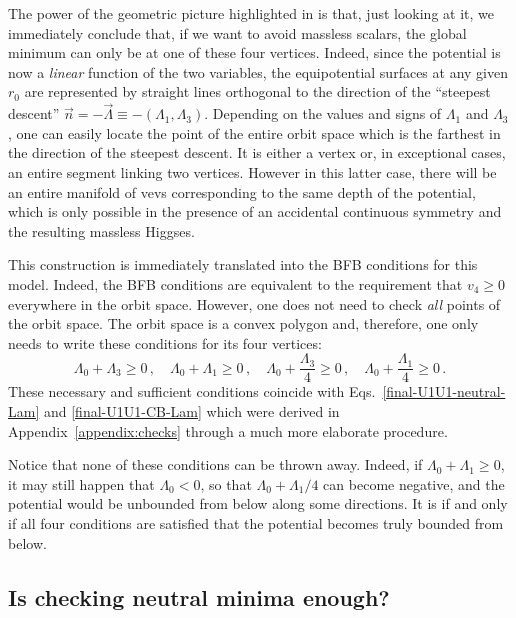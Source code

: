\documentclass[11pt]{article}
\begin{document}
The power of the geometric picture highlighted in \cite{Degee:2012sk} is that, just looking at it, we immediately conclude that, 
if we want to avoid massless scalars, the global minimum can only be at one of these four vertices.
Indeed, since the potential is now a {\em linear} function of the two variables,
the equipotential surfaces at any given $r_0$ are represented by straight lines orthogonal to the direction
of the ``steepest descent'' $\vec n = - \vec \Lambda \equiv -(\Lambda_1, \Lambda_3)$.
Depending on the values and signs of $\Lambda_1$ and $\Lambda_3$, one can easily locate the point of the entire orbit space
which is the farthest in the direction of the steepest descent.
It is either a vertex or, in exceptional cases, an entire segment linking two vertices. 
However in this latter case, there will be an entire manifold of vevs corresponding to the same depth of the potential,
which is only possible in the presence of an accidental continuous symmetry and the resulting massless Higgses.

This construction is immediately translated into the BFB conditions for this model.
Indeed, the BFB conditions are equivalent to the requirement that $v_4 \ge 0$ 
everywhere in the orbit space. However, one does not need to check {\em all} points of the orbit space.
The orbit space is a convex polygon and, therefore, one only needs to write these conditions
for its four vertices:
\begin{equation}
\Lambda_0 + \Lambda_3 \ge 0\,, \quad 
\Lambda_0 + \Lambda_1 \ge 0\,, \quad 
\Lambda_0 + \frac{\Lambda_3}{4} \ge 0\,, \quad 
\Lambda_0 + \frac{\Lambda_1}{4} \ge 0\,.\label{BFB-U1U1} 
\end{equation}
These necessary and sufficient conditions coincide with 
Eqs.~\eqref{final-U1U1-neutral-Lam} and \eqref{final-U1U1-CB-Lam}
which were derived in Appendix~\ref{appendix:checks} through a much more elaborate procedure.

Notice that none of these conditions can be thrown away.
Indeed, if $\Lambda_0 + \Lambda_1 \ge 0$, it may still happen that $\Lambda_0 < 0$, 
so that $\Lambda_0 + \Lambda_1/4$ can become negative, and the potential would be unbounded from below along some directions.
It is if and only if all four conditions are satisfied that the potential becomes truly bounded from below.

\subsection{Is checking neutral minima enough?}
\end{document}
